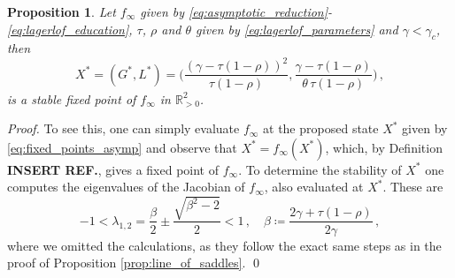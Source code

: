 \documentclass[a4paper,fleqn]{cas-sc}
\newtheorem{proposition}{Proposition}
\begin{document}
\begin{proposition}\label{prop:asymp_fixed_points}
    Let $f_{\infty}$ given by \eqref{eq:asymptotic_reduction}-\eqref{eq:lagerlof_education}, $\tau$, $\rho$ and $\theta$ given by \eqref{eq:lagerlof_parameters} and $\gamma<\gamma_c$, then
    \begin{equation}\label{eq:fixed_points_asymp}
        X^*=(G^*,L^*)=\bigg(\frac{(\gamma-\tau(1-\rho))^2}{\tau(1 - \rho)}, \frac{\gamma-\tau(1-\rho)}{\theta\,\tau(1 - \rho)}\bigg)\,,
    \end{equation}
    is a stable fixed point of $f_{\infty}$ in $\mathbb{R}^2_{>0}$.
\end{proposition}
%
\begin{proof}
    To see this, one can simply evaluate $f_{\infty}$ at the proposed state $X^*$ given by \eqref{eq:fixed_points_asymp} and observe that $X^*=f_{\infty}(X^*)$, which, by Definition \textbf{INSERT REF.}, gives a fixed point of $f_{\infty}$.
    To determine the stability of $X^*$ one computes the eigenvalues of the Jacobian of $f_{\infty}$, also evaluated at $X^*$. These are
    \begin{equation*}
        -1<\lambda_{1,2}=\frac{\beta}{2}\pm\frac{\sqrt{\beta^2-2}}{2}<1\,,\quad\beta\coloneqq\frac{2\gamma+\tau(1-\rho)}{2\gamma}\,,
    \end{equation*}
    where we omitted the calculations, as they follow the exact same steps as in the proof of Proposition \ref{prop:line_of_saddles}.
    \qed
\end{proof}
\end{document}
